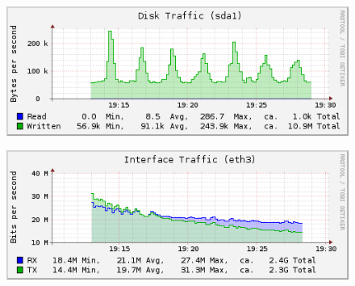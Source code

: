 \documentclass[Measurement results]{subfiles}
\begin{document}
\begin{figure}[H]
\centering
\includegraphics[scale=0.7]{images/results/200_with_naxsi_incremented_disallowed_parameters/disk.png}
\end{figure}

\begin{figure}[H]
\centering
\includegraphics[scale=0.7]{images/results/200_with_naxsi_incremented_disallowed_parameters/interface.png}
\end{figure}
\end{document}
